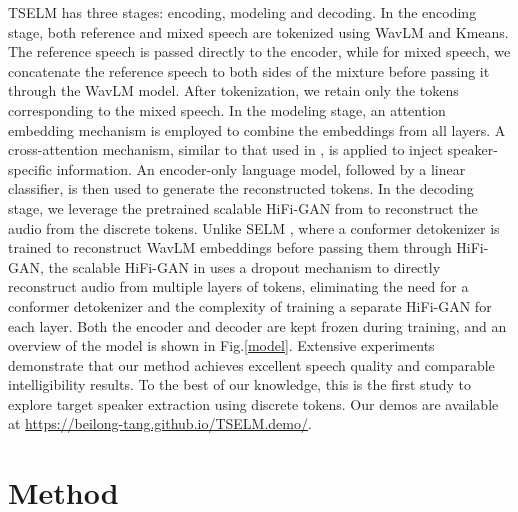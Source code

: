 \documentclass[conference]{IEEEtran}
\begin{document}
TSELM has three stages: encoding, modeling and decoding. In the encoding stage, both reference and mixed speech are tokenized using WavLM and Kmeans. The reference speech is passed directly to the encoder, while for mixed speech, we concatenate the reference speech to both sides of the mixture before passing it through the WavLM model. After tokenization, we retain only the tokens corresponding to the mixed speech.
In the modeling stage, an attention embedding mechanism is employed to combine the embeddings from all layers. A cross-attention mechanism, similar to that used in \cite{usef_tes}, is applied to inject speaker-specific information. An encoder-only language model, followed by a linear classifier, is then used to generate the reconstructed tokens.
In the decoding stage, we leverage the pretrained scalable HiFi-GAN from \cite{unit_hifi} to reconstruct the audio from the discrete tokens. Unlike SELM \cite{selm}, where a conformer detokenizer is trained to reconstruct WavLM embeddings before passing them through HiFi-GAN, the scalable HiFi-GAN in \cite{unit_hifi} uses a dropout mechanism to directly reconstruct audio from multiple layers of tokens, eliminating the need for a conformer detokenizer and the complexity of training a separate HiFi-GAN for each layer. Both the encoder and decoder are kept frozen during training, and an overview of the model is shown in Fig.\ref{model}.
Extensive experiments demonstrate that our method achieves excellent speech quality and comparable intelligibility results. To the best of our knowledge, this is the first study to explore target speaker extraction using discrete tokens. Our demos are available at \href{https://beilong-tang.github.io/TSELM.demo/}{https://beilong-tang.github.io/TSELM.demo/}.



\section{Method}
\end{document}
